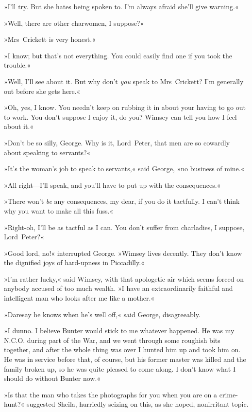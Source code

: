 »I'll try. But she hates being spoken to. I'm always afraid she'll give warning.«

»Well, there are other charwomen, I suppose?«

»Mrs~Crickett is very honest.«

»I know; but that's not everything. You could easily find one if you took the trouble.«

»Well, I'll see about it. But why don't \textit{you} speak to Mrs~Crickett? I'm generally out before she gets here.«

»Oh, yes, I know. You needn't keep on rubbing it in about your having to go out to work. You don't suppose I enjoy it, do you? Wimsey can tell you how I feel about it.«

»Don't be so silly, George. Why is it, Lord~Peter, that men are so cowardly about speaking to servants?«

»It's the woman's job to speak to servants,« said George, »no business of mine.«

»All right—I'll speak, and you'll have to put up with the consequences.«

»There won't \textit{be} any consequences, my dear, if you do it tactfully. I can't think why you want to make all this fuss.«

»Right-oh, I'll be as tactful as I can. You don't suffer from charladies, I suppose, Lord~Peter?«

»Good lord, no!« interrupted George. »Wimsey lives decently. They don't know the dignified joys of hard-upness in Piccadilly.«

»I'm rather lucky,« said Wimsey, with that apologetic air which seems forced on anybody accused of too much wealth. »I have an extraordinarily faithful and intelligent man who looks after me like a mother.«

»Daresay he knows when he's well off,« said George, disagreeably.

»I dunno. I believe Bunter would stick to me whatever happened. He was my N\@.C\@.O\@. during part of the War, and we went through some roughish bits together, and after the whole thing was over I hunted him up and took him on. He was in service before that, of course, but his former master was killed and the family broken up, so he was quite pleased to come along. I don't know what I should do without Bunter now.«

»Is that the man who takes the photographs for you when you are on a crime-hunt?« suggested Sheila, hurriedly seizing on this, as she hoped, nonirritant topic.

